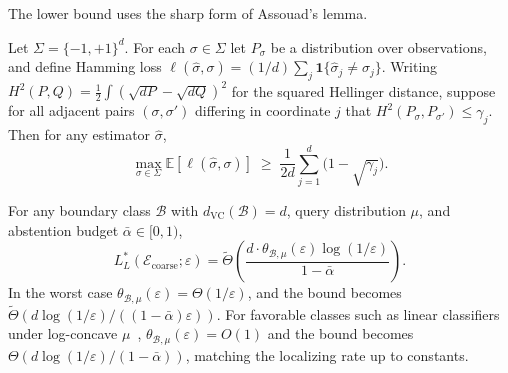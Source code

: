 \documentclass[runningheads,envcountsame]{llncs}
\newcommand{\cB}{\mathcal{B}}
\newcommand{\cE}{\mathcal{E}}
\newcommand{\E}{\mathbb{E}}
\newcommand{\ind}{\mathbf{1}}
\newcommand{\eps}{\varepsilon}
\newcommand{\dvc}{d_{\mathrm{VC}}}
\newcommand{\dis}{\theta}
\begin{document}
The lower bound uses the sharp form of Assouad's lemma.

\begin{lemma}
\label{lem:assouad-sharp}
Let $\Sigma = \{-1, +1\}^d$. For each $\sigma \in \Sigma$ let $P_\sigma$ be a distribution over observations, and define Hamming loss $\ell(\hat\sigma, \sigma) = (1/d) \sum_j \ind\{\hat\sigma_j \neq \sigma_j\}$. Writing $H^2(P, Q) = \tfrac{1}{2} \int (\sqrt{dP} - \sqrt{dQ})^2$ for the squared Hellinger distance, suppose for all adjacent pairs $(\sigma, \sigma')$ differing in coordinate $j$ that $H^2(P_\sigma, P_{\sigma'}) \leq \gamma_j$. Then for any estimator $\hat\sigma$,
\[
\max_{\sigma \in \Sigma} \E[\ell(\hat\sigma, \sigma)] \;\geq\; \frac{1}{2d} \sum_{j=1}^d \bigl(1 - \sqrt{\gamma_j}\bigr).
\]
\end{lemma}

\begin{theorem}
\label{thm:learner-value-coarse}
For any boundary class $\cB$ with $\dvc(\cB) = d$, query distribution $\mu$, and abstention budget $\bar\alpha \in [0, 1)$,
\[
L^*_L(\cE_{\mathrm{coarse}}; \eps) = \tilde\Theta\!\left( \frac{d \cdot \dis_{\cB,\mu}(\eps) \log(1/\eps)}{1-\bar\alpha} \right).
\]
In the worst case $\dis_{\cB,\mu}(\eps) = \Theta(1/\eps)$, and the bound becomes $\tilde\Theta(d \log(1/\eps)/((1-\bar\alpha)\eps))$. For favorable classes such as linear classifiers under log-concave $\mu$~\cite{wang2011smoothness}, $\dis_{\cB,\mu}(\eps) = O(1)$ and the bound becomes $\Theta(d \log(1/\eps)/(1-\bar\alpha))$, matching the localizing rate up to constants.
\end{theorem}
\end{document}
